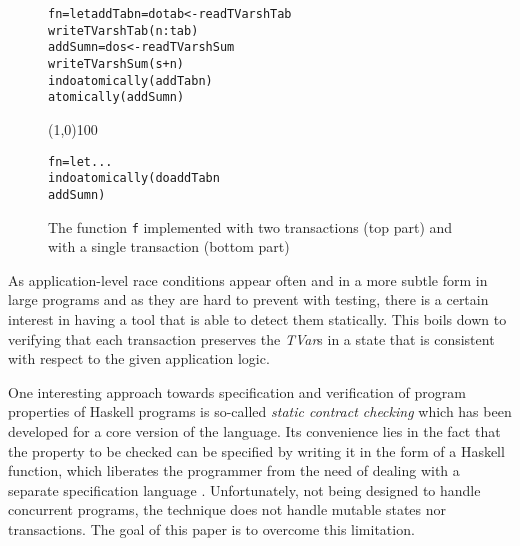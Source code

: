 \documentclass[submission,copyright,creativecommons]{eptcs}
\begin{document}
  
\begin{figure}[htb] 
\centering
\begin{footnotesize}
\begin{alltt}
f n = let addTab n = do tab <- readTVar shTab
                        writeTVar shTab (n:tab)
          addSum n = do s <- readTVar shSum
                        writeTVar shSum (s+n)
          in do atomically ( addTab n )     
                atomically ( addSum n )     
\end{alltt}
    \end{footnotesize}
\begin{center}
\line(1,0){100}
\end{center}
    \begin{footnotesize}
\begin{alltt}
f n = let ...
          in do atomically ( do addTab n    
                                addSum n )  
\end{alltt}
    \end{footnotesize}


\caption{The function \texttt{f} implemented with two transactions (top part) and with a single transaction (bottom part)}
\label{exempleintro}
\end{figure}
 
As application-level race conditions appear often and in a more subtle form in large programs \cite{learning-mistakes-comprehensive} and as they are hard to prevent with testing, there is a certain interest in having a tool that is able to detect them statically. This boils down to verifying that each transaction preserves the \emph{TVar}s in a state that is consistent with respect to the given application logic. 

One interesting approach towards specification and verification of program properties of Haskell programs is so-called \emph{static contract checking} \cite{static-contract-checking} which has been developed for a core version of the language. Its convenience lies in the fact that the property to be checked can be specified by writing it in the form of a Haskell function, which liberates the programmer from the need of dealing with a separate specification language \cite{static-contract-checking}. Unfortunately, not being designed to handle concurrent programs, the technique does not handle mutable states nor transactions. The goal of this paper is to overcome this limitation.
\end{document}
